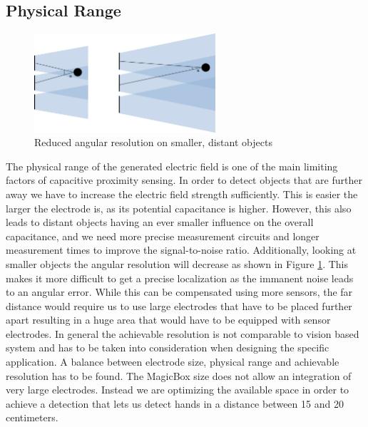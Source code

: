 \subsection{Physical Range}
\begin{figure}[h]
\centering
\includegraphics[width=0.6\textwidth]{images/limit_distance.png}
\caption{Reduced angular resolution on smaller, distant objects}
\label{fig:disc_ang_resolution}
\end{figure}
The physical range of the generated electric field is one of the main limiting factors of capacitive proximity sensing. In order to detect objects that are further away we have to increase the electric field strength sufficiently. This is easier the larger the electrode is, as its potential capacitance is higher. However, this also leads to distant objects having an ever smaller influence on the overall capacitance, and we need more precise measurement circuits and longer measurement times to improve the signal-to-noise ratio. Additionally, looking at smaller objects the angular resolution will decrease as shown in Figure \ref{fig:disc_ang_resolution}. This makes it more difficult to get a precise localization as the immanent noise leads to an angular error. While this can be compensated using more sensors, the far distance would require us to use large electrodes that have to be placed further apart resulting in a huge area that would have to be equipped with sensor electrodes.
In general the achievable resolution is not comparable to vision based system and has to be taken into consideration when designing the specific application. A balance between electrode size, physical range and achievable resolution has to be found.
The MagicBox size does not allow an integration of very large electrodes. Instead we are optimizing the available space in order to achieve a detection that lets us detect hands in a distance between 15 and 20 centimeters.
